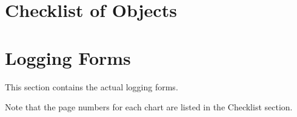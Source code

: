 \documentclass[a4paper,oneside]{book}
\begin{document}

\onecolumn

\chapter{Checklist of Objects}
\setlength{\marginparwidth}{0.1in}
\setlength{\marginparsep}{0in}
\setlength{\leftmargin}{-0.5in}



\chapter{Logging Forms}

This section contains the actual logging forms.

Note that the page numbers for each chart are listed in the Checklist
section.

\setlength{\marginparwidth}{0.2in}
\setlength{\marginparsep}{0in}
\setlength{\topmargin}{0.1in}
\addtolength{\voffset}{-0.3in}
\setlength{\leftmargin}{-0.5in}
\addtolength{\textwidth}{0.7in}
\setlength{\parindent}{0cm}
\setlength{\hangindent}{0cm}


\end{document}

